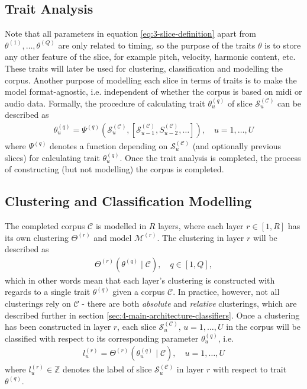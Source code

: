 \subsection{Trait Analysis}\label{sec:3-corpus-traits}
Note that all parameters in equation \ref{eq:3-slice-definition} apart from $\theta^{(1)}, \dots, \theta^{(Q)}$ are only related to timing, so the purpose of the traits $\theta$ is to store any other feature of the slice, for example pitch, velocity, harmonic content, etc. These traits will later be used for clustering, classification and modelling the corpus. Another purpose of modelling each slice in terms of traits is to make the model format-agnostic, i.e. independent of whether the corpus is based on midi or audio data. Formally, the procedure of calculating trait $\theta^{(q)}_u$ of slice $\mathcal S_u^{(\mathcal C)}$ can be described as 
\begin{align}\label{eq:3-trait-analysis}
	\theta^{(q)}_u = \Psi^{(q)} \left(\mathcal S_u^{(\mathcal C)}, \left[ \mathcal S^{(\mathcal C)}_{u-1},S^{(\mathcal C)}_{u-2},\dots\right]\right), \quad u = 1,\dots, U
\end{align}
where $\Psi^{(q)}$ denotes a function depending on $\mathcal S^{(\mathcal C)}_u$ (and optionally previous slices) for calculating trait $\theta^{(q)}_u$. Once the trait analysis is completed, the process of constructing (but not modelling) the corpus is completed. 

\subsection{Clustering and Classification Modelling}\label{sec:3-corpus-clustering}
The completed corpus $\mathcal C$  is modelled in $R$ layers, where each layer $r \in [1,R]$ has its own clustering $\Theta^{(r)}$ and model $\mathcal M^{(r)}$. The clustering in layer $r$ will be described as
\begin{align}\label{eq:3-corpus-clustering}
	\Theta^{(r)}\left(\theta^{(q)} \mid \mathcal C\right), \quad q \in [1, Q],
\end{align}
which in other words mean that each layer's clustering is constructed with regards to a single trait $\theta^{(q)}$ given a corpus $\mathcal C$. In practice, however, not all clusterings rely on $\mathcal C$ - there are both \textit{absolute} and \textit{relative} clusterings, which are described further in section \ref{sec:4-main-architecture-classifiers}. Once a clustering has been constructed in layer $r$, each slice $\mathcal S^{(\mathcal C)}_u$, $u= 1,\dots,U$ in the corpus will be classified with respect to its corresponding parameter $\theta^{(q)}_u$, i.e.
\begin{align}\label{eq:3-classification}
	l_u^{(r)} = \Theta^{(r)}	\left(\theta^{(q)}_u \mid \mathcal C\right), \quad u=1,\dots, U
\end{align}
where $l_u^{(r)} \in \mathbb Z$ denotes the label of slice $\mathcal S^{(\mathcal C)}_u$ in layer $r$ with respect to trait $\theta^{(q)}$.

